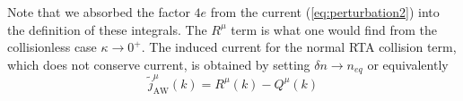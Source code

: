 Note that we absorbed the factor $4e$ from the current (\ref{eq:perturbation2}) into the definition of these integrals. The $R^{\mu}$ term is what one would find from the collisionless case $\kappa \rightarrow 0^+$. The induced current for the normal RTA collision term, which does not conserve current, is obtained by setting $\delta n \rightarrow n_{eq}$ or equivalently
\begin{equation}\label{eq:jRTA}
\widetilde{j}_{\mathrm{AW}}^\mu(k) = R^\mu(k) - Q^\mu(k)
\end{equation}



